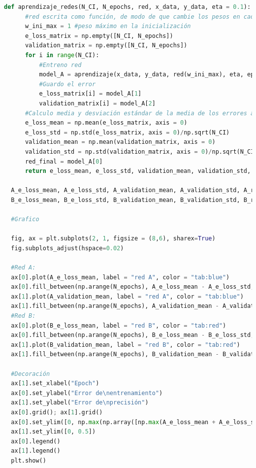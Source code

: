 \documentclass[aps,prb,twocolumn,superscriptaddress,floatfix,longbibliography]{revtex4-2}
\begin{document}
\begin{lstlisting}[language=Python]
  def aprendizaje_redes(N_CI, N_epochs, red, x_data, y_data, eta = 0.1):
      #red escrita como función, de modo de que cambie los pesos en cada CI
      w_ini_max = 1 #peso máximo en la inicialización
      e_loss_matrix = np.empty([N_CI, N_epochs])
      validation_matrix = np.empty([N_CI, N_epochs])
      for i in range(N_CI):
          #Entreno red
          model_A = aprendizaje(x_data, y_data, red(w_ini_max), eta, epochs = N_epochs)
          #Guardo el error
          e_loss_matrix[i] = model_A[1]
          validation_matrix[i] = model_A[2]
      #Calculo media y desviación estándar de la media de los errores a cada tiempo
      e_loss_mean = np.mean(e_loss_matrix, axis = 0)
      e_loss_std = np.std(e_loss_matrix, axis = 0)/np.sqrt(N_CI)
      validation_mean = np.mean(validation_matrix, axis = 0)
      validation_std = np.std(validation_matrix, axis = 0)/np.sqrt(N_CI)
      red_final = model_A[0]
      return e_loss_mean, e_loss_std, validation_mean, validation_std, red_final
  
  A_e_loss_mean, A_e_loss_std, A_validation_mean, A_validation_std, A_red_final = aprendizaje_redes(N_CI, N_epochs, red_A, x_data, y_data)
  B_e_loss_mean, B_e_loss_std, B_validation_mean, B_validation_std, B_red_final = aprendizaje_redes(N_CI, N_epochs, red_B, x_data, y_data)
  
  #Grafico
  
  fig, ax = plt.subplots(2, 1, figsize = (8,6), sharex=True)
  fig.subplots_adjust(hspace=0.02)
  
  #Red A:
  ax[0].plot(A_e_loss_mean, label = "red A", color = "tab:blue")
  ax[0].fill_between(np.arange(N_epochs), A_e_loss_mean - A_e_loss_std, A_e_loss_mean + A_e_loss_std, alpha = 0.2, color = "tab:blue")
  ax[1].plot(A_validation_mean, label = "red A", color = "tab:blue")
  ax[1].fill_between(np.arange(N_epochs), A_validation_mean - A_validation_std, A_validation_mean + A_validation_std, alpha = 0.2, color = "tab:blue")
  #Red B:
  ax[0].plot(B_e_loss_mean, label = "red B", color = "tab:red")
  ax[0].fill_between(np.arange(N_epochs), B_e_loss_mean - B_e_loss_std, B_e_loss_mean + B_e_loss_std, alpha = 0.2, color = "tab:red")
  ax[1].plot(B_validation_mean, label = "red B", color = "tab:red")
  ax[1].fill_between(np.arange(N_epochs), B_validation_mean - B_validation_std, B_validation_mean + B_validation_std, alpha = 0.2, color = "tab:red")
  
  #Decoración
  ax[1].set_xlabel("Epoch")
  ax[0].set_ylabel("Error de\nentrenamiento")
  ax[1].set_ylabel("Error de\nprecisión")
  ax[0].grid(); ax[1].grid()
  ax[0].set_ylim([0, np.max(np.array([np.max(A_e_loss_mean + A_e_loss_std), np.max(B_e_loss_mean + B_e_loss_std)] ) )])
  ax[1].set_ylim([0, 0.5])
  ax[0].legend()
  ax[1].legend()
  plt.show()
  

\end{lstlisting}
\end{document}
